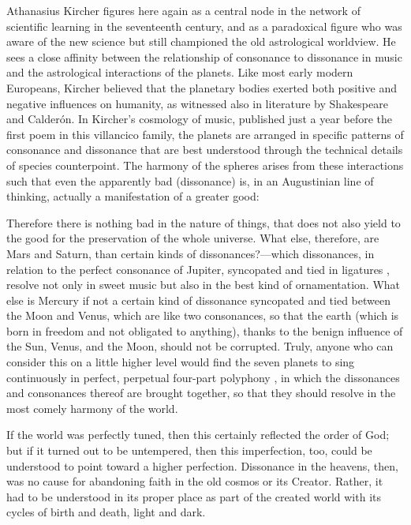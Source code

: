 
Athanasius Kircher figures here again as a central node in the network of
scientific learning in the seventeenth century, and as a paradoxical figure who
was aware of the new science but still championed the old astrological
worldview.
He sees a close affinity between the relationship of consonance to dissonance
in music and the astrological interactions of the planets.
Like most early modern Europeans, Kircher believed that the planetary bodies
exerted both positive and negative influences on humanity, as witnessed also
in literature by Shakespeare and Calderón.
In Kircher's cosmology of music, published just a year before the first poem in
this villancico family, the planets are arranged in specific patterns of
consonance and dissonance that are best understood through the technical
details of species counterpoint.
The harmony of the spheres arises from these interactions such that even the
apparently bad (dissonance) is, in an Augustinian line of thinking, actually a
manifestation of a greater good:
\begin{quoting}
	Therefore there is nothing bad in the nature of things, that does not
	also yield to the good for the preservation of the whole universe.
	What else, therefore, are Mars and Saturn, than certain kinds of
        dissonances?---which dissonances, in relation to the perfect consonance
        of Jupiter, syncopated and tied in ligatures , resolve
        not only in sweet music but also in the best kind of ornamentation.
	What else is Mercury if not a certain kind of dissonance syncopated and
	tied between the Moon and Venus, which are like two consonances, so that
	the earth (which is born in freedom and not obligated to anything),
	thanks to the benign influence of the Sun, Venus, and the Moon, should
	not be corrupted.
	Truly, anyone who can consider this on a little higher level would find
	the seven planets to sing continuously in perfect, perpetual four-part
	polyphony , in which the dissonances and
	consonances thereof are brought together, so that they should resolve in
	the most comely harmony of the world.%
        \Autocite[, 383--384]{Kircher:Musurgia}
\end{quoting}
If the world was perfectly tuned, then this certainly reflected the order of
God; but if it turned out to be untempered, then this imperfection, too, could
be understood to point toward a higher perfection.  
Dissonance in the heavens, then, was no cause for abandoning faith in the old
cosmos or its Creator.  
Rather, it had to be understood in its proper place as part of the created
world with its cycles of birth and death, light and dark.

